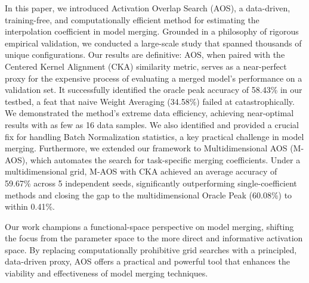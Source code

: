 \documentclass{article}
\theoremstyle{plain}
\theoremstyle{definition}
\theoremstyle{remark}
\begin{document}
In this paper, we introduced Activation Overlap Search (AOS), a data-driven, training-free, and computationally efficient method for estimating the interpolation coefficient in model merging. Grounded in a philosophy of rigorous empirical validation, we conducted a large-scale study that spanned thousands of unique configurations. Our results are definitive: AOS, when paired with the Centered Kernel Alignment (CKA) similarity metric, serves as a near-perfect proxy for the expensive process of evaluating a merged model's performance on a validation set. It successfully identified the oracle peak accuracy of 58.43\% in our testbed, a feat that naive Weight Averaging (34.58\%) failed at catastrophically. We demonstrated the method's extreme data efficiency, achieving near-optimal results with as few as 16 data samples. We also identified and provided a crucial fix for handling Batch Normalization statistics, a key practical challenge in model merging. Furthermore, we extended our framework to Multidimensional AOS (M-AOS), which automates the search for task-specific merging coefficients. Under a multidimensional grid, M-AOS with CKA achieved an average accuracy of 59.67\% across 5 independent seeds, significantly outperforming single-coefficient methods and closing the gap to the multidimensional Oracle Peak (60.08\%) to within 0.41\%.

Our work champions a functional-space perspective on model merging, shifting the focus from the parameter space to the more direct and informative activation space. By replacing computationally prohibitive grid searches with a principled, data-driven proxy, AOS offers a practical and powerful tool that enhances the viability and effectiveness of model merging techniques.

\nocite{langley00}



\end{document}
